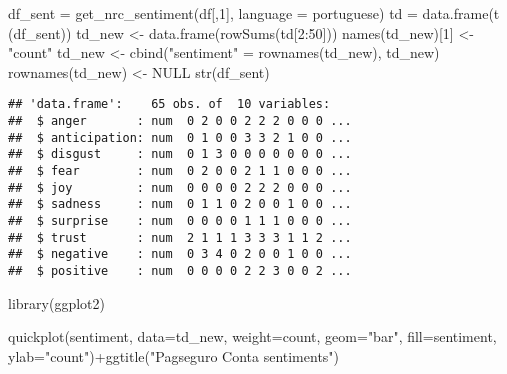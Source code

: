 \documentclass[
]{article}
\newenvironment{Shaded}{\begin{snugshade}}{\end{snugshade}}
\newcommand{\AttributeTok}[1]{\textcolor[rgb]{0.77,0.63,0.00}{#1}}
\newcommand{\ConstantTok}[1]{\textcolor[rgb]{0.00,0.00,0.00}{#1}}
\newcommand{\DecValTok}[1]{\textcolor[rgb]{0.00,0.00,0.81}{#1}}
\newcommand{\FunctionTok}[1]{\textcolor[rgb]{0.00,0.00,0.00}{#1}}
\newcommand{\NormalTok}[1]{#1}
\newcommand{\OtherTok}[1]{\textcolor[rgb]{0.56,0.35,0.01}{#1}}
\newcommand{\SpecialCharTok}[1]{\textcolor[rgb]{0.00,0.00,0.00}{#1}}
\newcommand{\StringTok}[1]{\textcolor[rgb]{0.31,0.60,0.02}{#1}}
\begin{document}
\begin{Shaded}
\begin{Highlighting}[]
\NormalTok{df\_sent }\OtherTok{=} \FunctionTok{get\_nrc\_sentiment}\NormalTok{(df[,}\DecValTok{1}\NormalTok{], }\AttributeTok{language =} \StringTok{\textquotesingle{}portuguese\textquotesingle{}}\NormalTok{)}
\NormalTok{td }\OtherTok{=} \FunctionTok{data.frame}\NormalTok{(}\FunctionTok{t}\NormalTok{ (df\_sent))}
\NormalTok{td\_new }\OtherTok{\textless{}{-}} \FunctionTok{data.frame}\NormalTok{(}\FunctionTok{rowSums}\NormalTok{(td[}\DecValTok{2}\SpecialCharTok{:}\DecValTok{50}\NormalTok{]))}
\FunctionTok{names}\NormalTok{(td\_new)[}\DecValTok{1}\NormalTok{] }\OtherTok{\textless{}{-}} \StringTok{"count"}
\NormalTok{td\_new }\OtherTok{\textless{}{-}} \FunctionTok{cbind}\NormalTok{(}\StringTok{"sentiment"} \OtherTok{=} \FunctionTok{rownames}\NormalTok{(td\_new), td\_new)}
\FunctionTok{rownames}\NormalTok{(td\_new) }\OtherTok{\textless{}{-}} \ConstantTok{NULL}
\FunctionTok{str}\NormalTok{(df\_sent)}
\end{Highlighting}
\end{Shaded}

\begin{verbatim}
## 'data.frame':    65 obs. of  10 variables:
##  $ anger       : num  0 2 0 0 2 2 2 0 0 0 ...
##  $ anticipation: num  0 1 0 0 3 3 2 1 0 0 ...
##  $ disgust     : num  0 1 3 0 0 0 0 0 0 0 ...
##  $ fear        : num  0 2 0 0 2 1 1 0 0 0 ...
##  $ joy         : num  0 0 0 0 2 2 2 0 0 0 ...
##  $ sadness     : num  0 1 1 0 2 0 0 1 0 0 ...
##  $ surprise    : num  0 0 0 0 1 1 1 0 0 0 ...
##  $ trust       : num  2 1 1 1 3 3 3 1 1 2 ...
##  $ negative    : num  0 3 4 0 2 0 0 1 0 0 ...
##  $ positive    : num  0 0 0 0 2 2 3 0 0 2 ...
\end{verbatim}

\begin{Shaded}
\begin{Highlighting}[]
\FunctionTok{library}\NormalTok{(ggplot2)}

\FunctionTok{quickplot}\NormalTok{(sentiment, }\AttributeTok{data=}\NormalTok{td\_new, }\AttributeTok{weight=}\NormalTok{count, }\AttributeTok{geom=}\StringTok{"bar"}\NormalTok{, }\AttributeTok{fill=}\NormalTok{sentiment, }\AttributeTok{ylab=}\StringTok{"count"}\NormalTok{)}\SpecialCharTok{+}\FunctionTok{ggtitle}\NormalTok{(}\StringTok{"Pagseguro Conta sentiments"}\NormalTok{)}
\end{Highlighting}
\end{Shaded}
\end{document}
